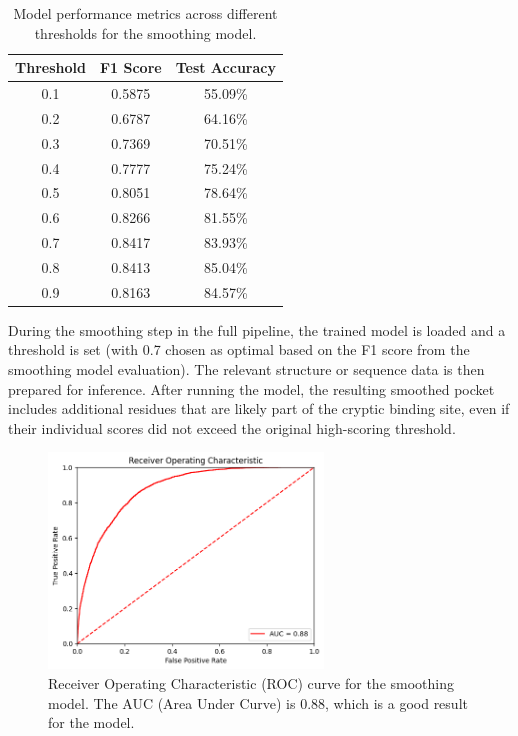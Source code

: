 \begin{table}[htbp]
    \centering
    \caption{Model performance metrics across different thresholds for the smoothing model.}
    \label{tab:smoothing-thresholds}
    \begin{tabular}{c|c|c}
        \hline
        \textbf{Threshold} & \textbf{F1 Score} & \textbf{Test Accuracy} \\
        \hline
        0.1 & 0.5875 & 55.09\% \\
        0.2 & 0.6787 & 64.16\% \\
        0.3 & 0.7369 & 70.51\% \\
        0.4 & 0.7777 & 75.24\% \\
        0.5 & 0.8051 & 78.64\% \\
        0.6 & 0.8266 & 81.55\% \\
        0.7 & 0.8417 & 83.93\% \\
        0.8 & 0.8413 & 85.04\% \\
        0.9 & 0.8163 & 84.57\% \\
        \hline
    \end{tabular}
\end{table}

During the smoothing step in the full pipeline, the trained model is loaded and a threshold is set (with 0.7 chosen as optimal based on the F1 score from the smoothing model evaluation). The relevant structure or sequence data is then prepared for inference. After running the model, the resulting smoothed pocket includes additional residues that are likely part of the cryptic binding site, even if their individual scores did not exceed the original high-scoring threshold.

\begin{figure}[htpb]
    \centering
    \includegraphics[width=0.65\textwidth]{img/smoothing-roc.png}
    \caption{Receiver Operating Characteristic (ROC) curve for the smoothing model. The AUC (Area Under Curve) is 0.88, which is a good result for the model.}
    \label{fig:smoothing-roc}
\end{figure}

